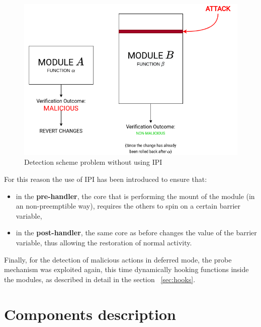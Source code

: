 \documentclass{article}
\begin{document}
	\begin{figure}[!htbp]
		\centering
		\includegraphics[scale=0.4]{concurrency}
		\caption{Detection scheme problem without using IPI}
		\label{fig:concurrency}
	\end{figure}

	For this reason the use of IPI has been introduced to ensure that:
	\begin{itemize}
		\item in the \textbf{pre-handler}, the core that is performing the mount of the module (in an non-preemptible
		way), requires the others to spin on a certain barrier variable,
		\item in the \textbf{post-handler}, the same core as before changes the value of the barrier variable, thus
		allowing the restoration of normal activity.
	\end{itemize}

	Finally, for the detection of malicious actions in deferred mode, the probe mechanism was exploited again, this
	time dynamically hooking functions inside the modules, as described in detail in the section ~\ref{sec:hooks}.

	\section{Components description}
\end{document}

